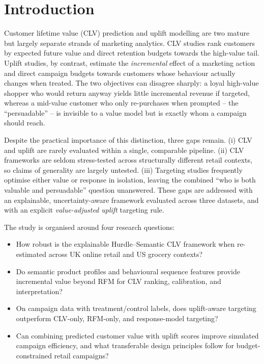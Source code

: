 \documentclass[pdflatex,sn-mathphys-num]{sn-jnl}
\theoremstyle{thmstyleone}
\theoremstyle{thmstylethree}
\begin{document}
\section{Introduction}\label{sec:intro}
Customer lifetime value (CLV) prediction and uplift modelling are two mature but largely separate
strands of marketing analytics. CLV studies rank customers by expected future value and direct
retention budgets towards the high-value tail. Uplift studies, by contrast, estimate the
\emph{incremental} effect of a marketing action and direct campaign budgets towards customers
whose behaviour actually changes when treated. The two objectives can disagree sharply: a loyal
high-value shopper who would return anyway yields little incremental revenue if targeted, whereas a
mid-value customer who only re-purchases when prompted -- the ``persuadable'' -- is invisible to a
value model but is exactly whom a campaign should reach.

Despite the practical importance of this distinction, three gaps remain. (i) CLV and uplift are
rarely evaluated within a single, comparable pipeline. (ii) CLV frameworks are seldom stress-tested
across structurally different retail contexts, so claims of generality are largely untested.
(iii) Targeting studies frequently optimise either value or response in isolation, leaving the
combined ``who is both valuable and persuadable'' question unanswered. These gaps are addressed with
an explainable, uncertainty-aware framework evaluated across three datasets, and with an explicit
\emph{value-adjusted uplift} targeting rule.

The study is organised around four research questions:
\begin{itemize}
  \item[\textbf{RQ1}] How robust is the explainable Hurdle--Semantic CLV framework when
  re-estimated across UK online retail and US grocery contexts?
  \item[\textbf{RQ2}] Do semantic product profiles and behavioural sequence features provide
  incremental value beyond RFM for CLV ranking, calibration, and interpretation?
  \item[\textbf{RQ3}] On campaign data with treatment/control labels, does uplift-aware targeting
  outperform CLV-only, RFM-only, and response-model targeting?
  \item[\textbf{RQ4}] Can combining predicted customer value with uplift scores improve simulated
  campaign efficiency, and what transferable design principles follow for budget-constrained
  retail campaigns?
\end{itemize}
\end{document}
